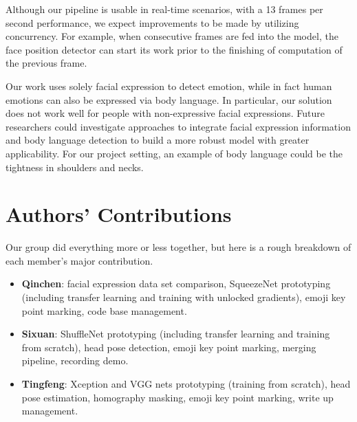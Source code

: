 \documentclass{article}
\begin{document}
Although our pipeline is usable in real-time scenarios, with a 13 frames per second performance, we expect improvements to be made by utilizing concurrency. For example, when consecutive frames are fed into the model, the face position detector can start its work prior to the finishing of computation of the previous frame.

Our work uses solely facial expression to detect emotion, while in fact human emotions can also be expressed via body language. In particular, our solution does not work well for people with non-expressive facial expressions. Future researchers could investigate approaches to integrate facial expression information and body language detection to build a more robust model with greater applicability. For our project setting, an example of body language could be the tightness in shoulders and necks.

\section{Authors' Contributions}
Our group did everything more or less together, but here is a rough breakdown of each member's major contribution. 
\begin{itemize}
    \item \textbf{Qinchen}: facial expression data set comparison, SqueezeNet prototyping (including transfer learning and training with unlocked gradients), emoji key point marking, code base management. 
    \item \textbf{Sixuan}: ShuffleNet prototyping (including transfer learning and training from scratch), head pose detection, emoji key point marking, merging pipeline, recording demo. 
    \item \textbf{Tingfeng}: Xception and VGG nets prototyping (training from scratch), head pose estimation, homography masking, emoji key point marking, write up management. 
\end{itemize}




\end{document}
